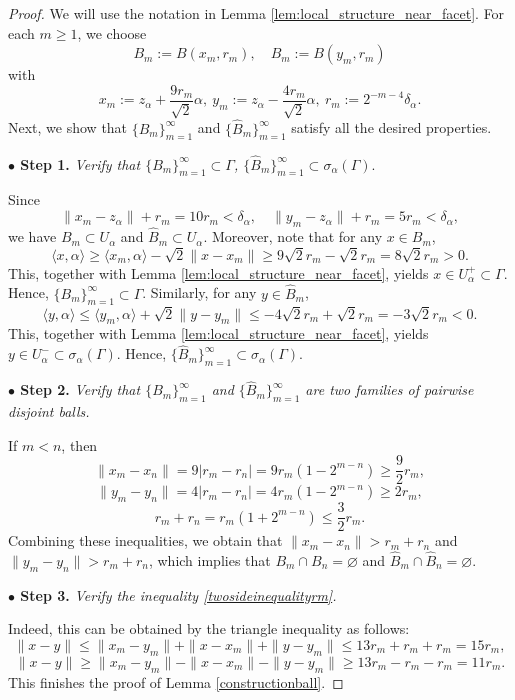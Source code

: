 \documentclass[12pt]{amsart}
\begin{document}
\begin{proof}
We will use the notation in Lemma \ref{lem:local_structure_near_facet}. For each $m\geq 1$, we choose
$$B_m:=B(x_m,r_m),\quad \hat{B}_m:=B(y_m,r_m)$$
with
$$x_m:=z_\alpha+\frac{9r_m}{\sqrt{2}}\alpha,\ y_m:=z_\alpha-\frac{4r_m}{\sqrt{2}}\alpha,\ r_m:=2^{-m-4}\delta_\alpha.$$
Next, we show that $\{B_m\}_{m=1}^\infty$ and $\{\hat{B}_m\}_{m=1}^\infty$ satisfy all the desired properties.

{\bf $\bullet$ Step 1.} {\it Verify that $\{B_m\}_{m=1}^\infty\subset \Gamma$, $\{\hat{B}_m\}_{m=1}^\infty\subset \sigma_\alpha(\Gamma).$}

Since
$$\|x_m-z_\alpha\|+r_m=10r_m<\delta_\alpha,\quad\|y_m-z_\alpha\|+r_m=5r_m<\delta_\alpha,$$
we have $B_m\subset U_\alpha$ and $\hat{B}_m\subset U_\alpha$. Moreover, note that for any $x\in B_m$,
$$\langle x,\alpha\rangle\geq \langle x_m,\alpha\rangle -\sqrt{2}\|x-x_m\|\geq 9\sqrt{2}r_m-\sqrt{2}r_m=8\sqrt{2}r_m>0.$$
This, together with Lemma \ref{lem:local_structure_near_facet}, yields $x\in U_\alpha^+\subset \Gamma$. Hence, $\{B_m\}_{m=1}^\infty\subset \Gamma$. Similarly, for any $y\in\hat{B}_m$,
$$\langle y,\alpha\rangle\leq \langle y_m,\alpha\rangle+\sqrt{2}\|y-y_m\|\leq -4\sqrt{2}r_m+\sqrt{2}r_m=-3\sqrt{2}r_m<0.$$
This, together with Lemma \ref{lem:local_structure_near_facet}, yields $y\in U_\alpha^-\subset\sigma_\alpha(\Gamma)$. Hence,
$\{\hat{B}_m\}_{m=1}^\infty\subset \sigma_\alpha(\Gamma).$

{\bf $\bullet$ Step 2.} {\it Verify that $\{B_m\}_{m=1}^\infty$ and $\{\hat{B}_m\}_{m=1}^\infty$ are two families of pairwise disjoint balls.}

If $m<n$, then
$$\|x_m-x_n\|=9|r_m-r_n|=9r_m(1-2^{m-n})\geq \frac{9}{2}r_m,$$
$$\|y_m-y_n\|=4|r_m-r_n|=4r_m(1-2^{m-n})\geq 2r_m,$$
$$r_m+r_n=r_m(1+2^{m-n})\leq \frac{3}{2}r_m.$$
Combining these inequalities, we obtain that $\|x_m-x_n\|> r_m+r_n$ and $\|y_m-y_n\|> r_m+r_n$, which implies that $B_m\cap B_n=\varnothing$ and $\hat{B}_m\cap \hat{B}_n=\varnothing$.

{\bf $\bullet$ Step 3.} {\it Verify the inequality \eqref{twosideinequalityrm}.}

Indeed, this can be obtained by the triangle inequality as follows:
$$\|x-y\|\leq \|x_m-y_m\|+\|x-x_m\|+\|y-y_m\|\leq 13r_m+r_m+r_m=15r_m,$$
$$\|x-y\|\geq \|x_m-y_m\|-\|x-x_m\|-\|y-y_m\|\geq 13r_m-r_m-r_m=11r_m.$$
This finishes the proof of Lemma \ref{constructionball}.
\end{proof}
\end{document}
